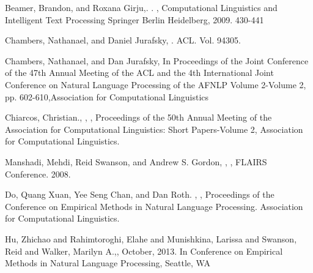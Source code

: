 \documentclass[11pt]{article}
\begin{document}
\begin{thebibliography}{}

Beamer, Brandon, and Roxana Girju,.
.
, 
\newblock Computational Linguistics and Intelligent Text Processing
\newblock Springer Berlin Heidelberg, 2009. 430-441

	   
	Chambers, Nathanael, and Daniel Jurafsky,
	.
	  ACL. Vol. 94305.

	Chambers, Nathanael, and Dan Jurafsky,
	\newblock In Proceedings of the Joint Conference of the 47th Annual Meeting of the ACL and the 4th International Joint Conference on Natural Language Processing of the AFNLP
	  \newblock Volume 2-Volume 2, pp. 602-610,Association for Computational Linguistics

	Chiarcos, Christian.,
	,
	,
	\newblock  Proceedings of the 50th Annual Meeting of the Association for Computational Linguistics: Short Papers-Volume 2,
	\newblock Association for Computational Linguistics.

	
	Manshadi, Mehdi, Reid Swanson, and Andrew S. Gordon,
	,
	,
	 \newblock FLAIRS Conference. 2008.

	Do, Quang Xuan, Yee Seng Chan, and Dan Roth.
	,
	,
	 \newblock Proceedings of the Conference on Empirical Methods in Natural Language Processing. 
	 \newblock Association for Computational Linguistics.
	 
	Hu, Zhichao and Rahimtoroghi, Elahe and Munishkina, Larissa and Swanson, Reid and Walker, Marilyn A.,,
	\newblock  October, 2013.
	\newblock In Conference on Empirical Methods in Natural Language Processing,
	\newblock Seattle, WA
	 

\end{thebibliography}
\end{document}
